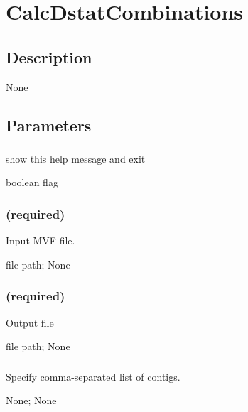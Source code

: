 \documentclass[letterpaper,11pt,english]{sphinxmanual}
\begin{document}
\section{CalcDstatCombinations}
\label{\detokenize{prog_desc:calcdstatcombinations}}

\subsection{Description}
\label{\detokenize{prog_desc:id49}}
None


\subsection{Parameters}
\label{\detokenize{prog_desc:id50}}

\subsubsection{}
\label{\detokenize{prog_desc:id51}}
 show this help message and exit

 boolean flag


\subsubsection{ (required)}
\label{\detokenize{prog_desc:id52}}
 Input MVF file.

 file path;  None


\subsubsection{ (required)}
\label{\detokenize{prog_desc:id53}}
 Output file

 file path;  None


\subsubsection{}
\label{\detokenize{prog_desc:id54}}
 Specify comma-separated list of contigs.

 None;  None
\end{document}
